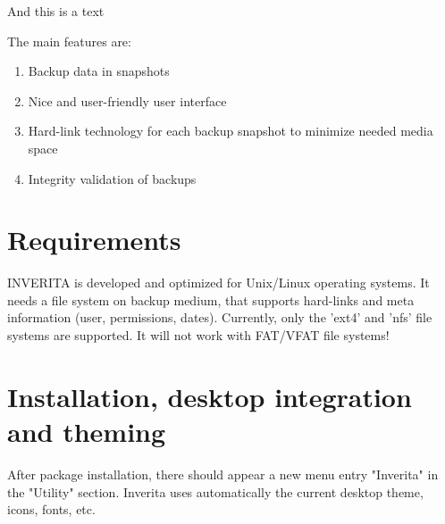 And this is a text

The main features are:
\begin{enumerate}
  \item Backup data in snapshots
  \item Nice and user-friendly user interface
  \item Hard-link technology for each backup snapshot to minimize needed media space
  \item Integrity validation of backups
\end{enumerate}


\section{Requirements}
INVERITA is developed and optimized for Unix/Linux operating systems.
It needs a file system on backup medium, that supports hard-links and
meta information (user, permissions, dates).
Currently, only the 'ext4' and 'nfs' file systems are supported.
It will not work with FAT/VFAT file systems!


\section{Installation, desktop integration and theming}
After package installation, there should appear a new menu entry "Inverita" in the
"Utility" section. Inverita uses automatically the current desktop theme, icons,
fonts, etc.


